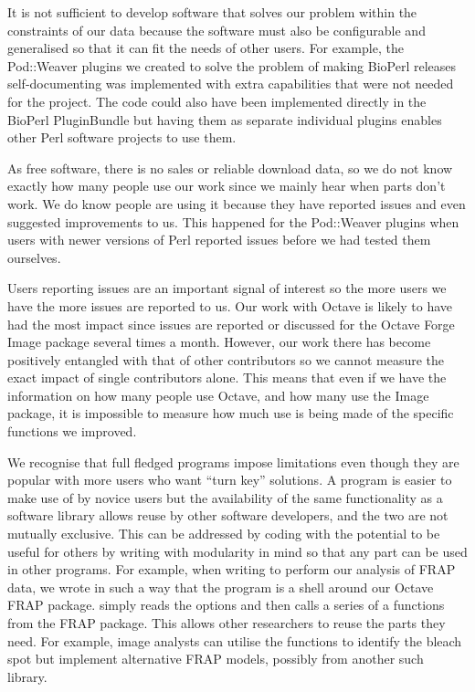 It is not sufficient to develop software that solves our problem
within the constraints of our data
because the software must also be configurable and
generalised so that it can fit the needs of other users.  For example, the
Pod::Weaver plugins we created to solve the problem of making BioPerl
releases self-documenting was implemented
with extra capabilities that were not needed
for the project.
The code could also have been implemented
directly in the BioPerl PluginBundle but having
them as separate individual plugins enables other Perl software projects to use
them.

As free software, there is no sales or reliable download data, so
we do not know exactly how many people use
our work since we mainly hear when parts don't work.  We do
know people are using it because they have reported issues and even suggested
improvements to us.  This happened for the Pod::Weaver plugins
when users with newer versions of Perl
reported issues before we had tested them ourselves.

Users reporting issues are an important signal of interest so
the more users we have the more issues are reported to us.
Our work with Octave is likely to have had the most impact since
issues are reported or discussed for the Octave Forge Image package
several times a month.  However, our work there has
become positively entangled with that of other contributors
so we cannot measure the exact impact of single contributors alone.
This means that even if we have the information on how many people use Octave,
and how many use the Image package, it is impossible to measure
how much use is being made of the specific
functions we improved.

We recognise that full fledged programs impose limitations even though
they are popular with more users who want ``turn key'' solutions.
A program is easier to make use of by novice users
but the availability of the same functionality as a software library allows
reuse by other software developers, and the two are not mutually exclusive.
This can be addressed by coding with the potential to be useful for
others by writing with modularity in mind so that any part can be used in
other programs.  For example, when writing 
to perform our analysis of FRAP data, we wrote in such a way that the
program is a shell around our Octave FRAP
package.   simply reads the options and then calls
a series of a functions from the FRAP package.
This allows other
researchers to reuse the parts they need.  For example, image analysts
can utilise
the functions to identify the bleach spot but implement alternative FRAP
models, possibly from another such library.

